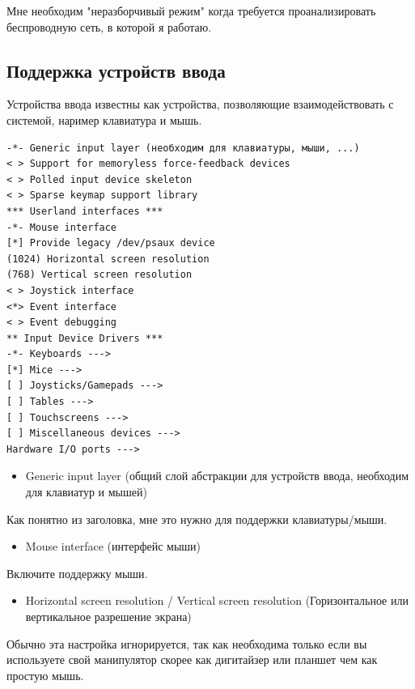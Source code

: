 \documentclass[10pt]{book}
\begin{document}
Мне необходим "неразборчивый режим" когда требуется проанализировать беспроводную сеть, в которой я работаю.

\subsection{Поддержка устройств ввода}

Устройства ввода известны как устройства, позволяющие взаимодействовать с системой, наример клавиатура и мышь.

\vspace{3mm}
\begin{tcolorbox}[colback=gray!14!white, colframe=blue!75!blue]
\begin{lstlisting}
-*- Generic input layer (необходим для клавиатуры, мыши, ...)
< > Support for memoryless force-feedback devices
< > Polled input device skeleton
< > Sparse keymap support library
*** Userland interfaces ***
-*- Mouse interface
[*] Provide legacy /dev/psaux device
(1024) Horizontal screen resolution
(768) Vertical screen resolution
< > Joystick interface
<*> Event interface
< > Event debugging
** Input Device Drivers ***
-*- Keyboards --->
[*] Mice --->
[ ] Joysticks/Gamepads --->
[ ] Tables --->
[ ] Touchscreens --->
[ ] Miscellaneous devices --->
Hardware I/O ports --->
\end{lstlisting}
\end{tcolorbox}

\begin{itemize}
\item Generic input layer (общий слой абстракции для устройств ввода, необходим для клавиатур и мышей)
\end{itemize}

Как понятно из заголовка, мне это нужно для поддержки клавиатуры/мыши.

\begin{itemize}
\item Mouse interface (интерфейс мыши)
\end{itemize}

Включите поддержку мыши.

\begin{itemize}
\item Horizontal screen resolution / Vertical screen resolution (Горизонтальное или вертикальное разрешение экрана)
\end{itemize}

Обычно эта настройка игнорируется, так как необходима только если вы используете свой манипулятор скорее как дигитайзер или планшет чем как простую мышь.
\end{document}
